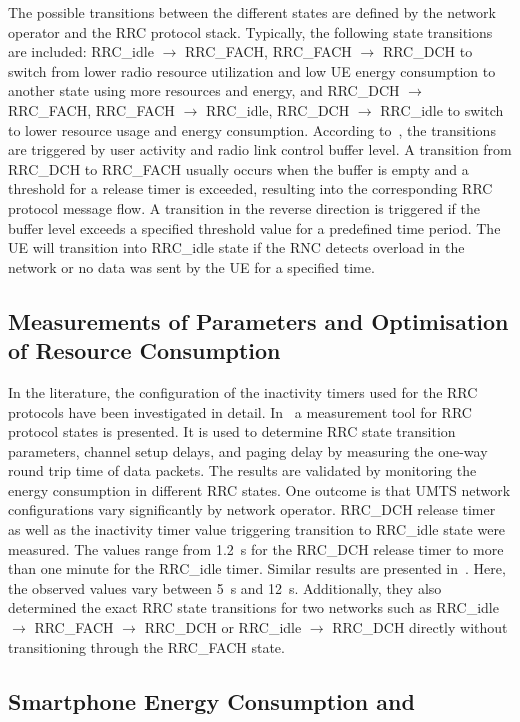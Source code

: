 The possible transitions between the different states are defined by the network operator and the \gls{RRC} protocol stack.
Typically, the following state transitions are included: 
\gls{RRC_idle} \(\rightarrow\) \gls{RRC_FACH},
\gls{RRC_FACH} \(\rightarrow\) \gls{RRC_DCH} to switch from lower radio resource utilization and low \gls{UE} energy consumption to another state using more resources and energy, and 
\gls{RRC_DCH} \(\rightarrow\) \gls{RRC_FACH}, 
\gls{RRC_FACH} \(\rightarrow\) \gls{RRC_idle},
\gls{RRC_DCH} \(\rightarrow\) \gls{RRC_idle} to switch to lower resource usage and energy consumption.
According to~\cite{Perala2009,Qian2010a}, the transitions are triggered by user activity and radio link control buffer level. 
A transition from \gls{RRC_DCH} to \gls{RRC_FACH} usually occurs when the buffer is empty and a threshold for a release timer is exceeded, resulting into the corresponding \gls{RRC} protocol message flow.
A transition in the reverse direction is triggered if the buffer level exceeds a specified threshold value for a predefined time period.
The \gls{UE} will transition into \gls{RRC_idle} state if the \gls{RNC} detects overload in the network or no data was sent by the \gls{UE} for a specified time.

\subsection{Measurements of  Parameters and Optimisation of Resource Consumption}\label{sec:network:background:measurement_optimisation}

In the literature, the configuration of the inactivity timers used for the \gls{RRC} protocols have been investigated in detail.
In~\cite{Perala2009} a measurement tool for \gls{RRC} protocol states is presented. 
It is used to determine \gls{RRC} state transition parameters, channel setup delays, and paging delay by measuring the one-way round trip time of data packets.
The results are validated by monitoring the energy consumption in different \gls{RRC} states.
One outcome is that \gls{UMTS} network configurations vary significantly by network operator.
\gls{RRC_DCH} release timer as well as the inactivity timer value triggering transition to \gls{RRC_idle} state were measured.
The values range from \SI{1.2}{\second} for the \gls{RRC_DCH} release timer to more than one minute for the \gls{RRC_idle} timer.
Similar results are presented in~\cite{Qian2010a}.
Here, the observed values vary between \SI{5}{\second} and \SI{12}{\second}. 
Additionally, they also determined the exact \gls{RRC} state transitions for two networks such as \gls{RRC_idle} \(\rightarrow\) \gls{RRC_FACH} \(\rightarrow\) \gls{RRC_DCH} or  \gls{RRC_idle} \(\rightarrow\) \gls{RRC_DCH} directly without transitioning through the \gls{RRC_FACH} state.

\subsection{Smartphone Energy Consumption and }\label{sec:network:background:energy_consumption_qoe}